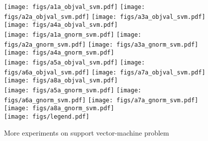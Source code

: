 \begin{figure}[!h]
\centering
\texttt{[image: figs/a1a\_objval\_svm.pdf]}
\texttt{[image: figs/a2a\_objval\_svm.pdf]}
\texttt{[image: figs/a3a\_objval\_svm.pdf]}
\texttt{[image: figs/a4a\_objval\_svm.pdf]}
\\
\texttt{[image: figs/a1a\_gnorm\_svm.pdf]}
\texttt{[image: figs/a2a\_gnorm\_svm.pdf]}
\texttt{[image: figs/a3a\_gnorm\_svm.pdf]}
\texttt{[image: figs/a4a\_gnorm\_svm.pdf]}
\\
\texttt{[image: figs/a5a\_objval\_svm.pdf]}
\texttt{[image: figs/a6a\_objval\_svm.pdf]}
\texttt{[image: figs/a7a\_objval\_svm.pdf]}
\texttt{[image: figs/a8a\_objval\_svm.pdf]}
\\
\texttt{[image: figs/a5a\_gnorm\_svm.pdf]}
\texttt{[image: figs/a6a\_gnorm\_svm.pdf]}
\texttt{[image: figs/a7a\_gnorm\_svm.pdf]}
\texttt{[image: figs/a8a\_gnorm\_svm.pdf]}
\\
\texttt{[image: figs/legend.pdf]}
\caption{More experiments on support vector-machine problem}
\label{fig:svm-add-1}
\end{figure}


